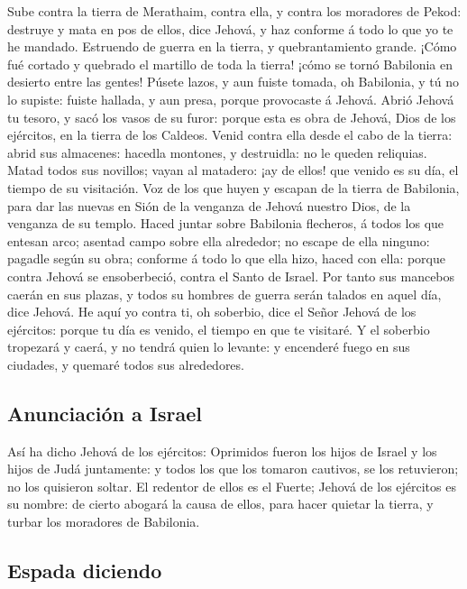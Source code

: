  Sube contra la tierra de Merathaim, contra ella, y contra
los moradores de Pekod: destruye y mata en pos de ellos, dice Jehová, y
haz conforme á todo lo que yo te he mandado.  Estruendo de
guerra en la tierra, y quebrantamiento grande.  ¡Cómo fué
cortado y quebrado el martillo de toda la tierra! ¡cómo se tornó
Babilonia en desierto entre las gentes!  Púsete lazos, y
aun fuiste tomada, oh Babilonia, y tú no lo supiste: fuiste hallada, y
aun presa, porque provocaste á Jehová.  Abrió Jehová tu
tesoro, y sacó los vasos de su furor: porque esta es obra de Jehová,
Dios de los ejércitos, en la tierra de los Caldeos.  Venid
contra ella desde el cabo de la tierra: abrid sus almacenes: hacedla
montones, y destruidla: no le queden reliquias.  Matad
todos sus novillos; vayan al matadero: ¡ay de ellos! que venido es su
día, el tiempo de su visitación.  Voz de los que huyen y
escapan de la tierra de Babilonia, para dar las nuevas en Sión de la
venganza de Jehová nuestro Dios, de la venganza de su templo.
 Haced juntar sobre Babilonia flecheros, á todos los que
entesan arco; asentad campo sobre ella alrededor; no escape de ella
ninguno: pagadle según su obra; conforme á todo lo que ella hizo, haced
con ella: porque contra Jehová se ensoberbeció, contra el Santo de
Israel.  Por tanto sus mancebos caerán en sus plazas, y
todos su hombres de guerra serán talados en aquel día, dice Jehová.
 He aquí yo contra ti, oh soberbio, dice el Señor Jehová de
los ejércitos: porque tu día es venido, el tiempo en que te visitaré.
 Y el soberbio tropezará y caerá, y no tendrá quien lo
levante: y encenderé fuego en sus ciudades, y quemaré todos sus
alrededores.

\hypertarget{anunciaciuxf3n-a-israel}{%
\subsection{Anunciación a Israel}\label{anunciaciuxf3n-a-israel}}

 Así ha dicho Jehová de los ejércitos: Oprimidos fueron los
hijos de Israel y los hijos de Judá juntamente: y todos los que los
tomaron cautivos, se los retuvieron; no los quisieron soltar.
 El redentor de ellos es el Fuerte; Jehová de los ejércitos
es su nombre: de cierto abogará la causa de ellos, para hacer quietar la
tierra, y turbar los moradores de Babilonia.

\hypertarget{espada-diciendo}{%
\subsection{Espada diciendo}\label{espada-diciendo}}

